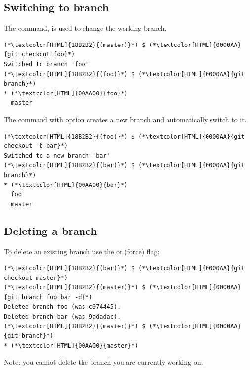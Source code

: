 \subsection{Switching to branch}
\begin{frame}[fragile]
    \subslidetitle
The  command, is used to change the working branch.
\begin{lstlisting}
(*\textcolor[HTML]{18B2B2}{(master)}*) $ (*\textcolor[HTML]{0000AA}{git checkout foo}*)
Switched to branch 'foo'
(*\textcolor[HTML]{18B2B2}{(foo)}*) $ (*\textcolor[HTML]{0000AA}{git branch}*)
* (*\textcolor[HTML]{00AA00}{foo}*)
  master
\end{lstlisting}

The  command with  option creates a new branch and automatically switch to it.
\begin{lstlisting}
(*\textcolor[HTML]{18B2B2}{(foo)}*) $ (*\textcolor[HTML]{0000AA}{git checkout -b bar}*)
Switched to a new branch 'bar'
(*\textcolor[HTML]{18B2B2}{(bar)}*) $ (*\textcolor[HTML]{0000AA}{git branch}*)
* (*\textcolor[HTML]{00AA00}{bar}*)
  foo
  master
\end{lstlisting}
\end{frame}

\subsection{Deleting a branch}
\begin{frame}[fragile]
    \subslidetitle
To delete an existing branch use the  or  (force) flag:
\begin{lstlisting}
(*\textcolor[HTML]{18B2B2}{(bar)}*) $ (*\textcolor[HTML]{0000AA}{git checkout master}*)
(*\textcolor[HTML]{18B2B2}{(master)}*) $ (*\textcolor[HTML]{0000AA}{git branch foo bar -d}*)
Deleted branch foo (was c974445).
Deleted branch bar (was 9adadac).
(*\textcolor[HTML]{18B2B2}{(master)}*) $ (*\textcolor[HTML]{0000AA}{git branch}*)
* (*\textcolor[HTML]{00AA00}{master}*)
\end{lstlisting}

Note: you cannot delete the branch you are currently working on.

\end{frame}


